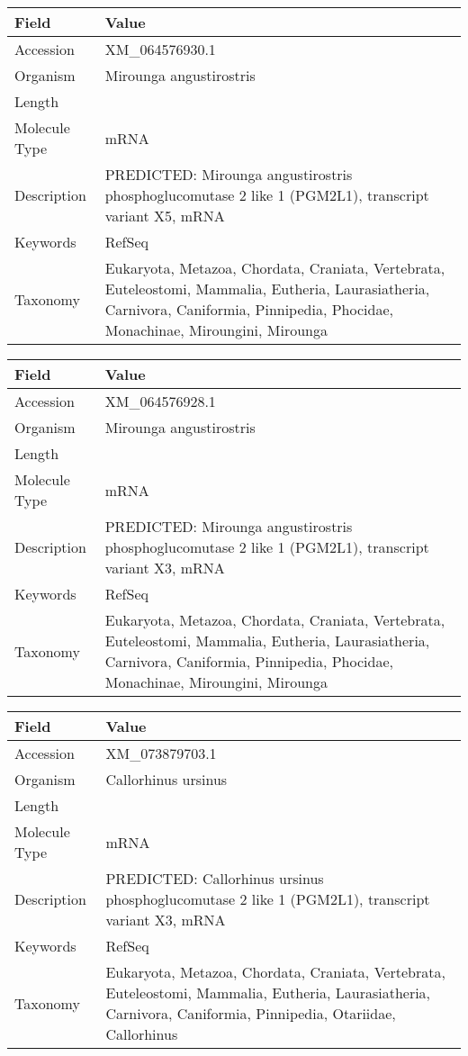 \documentclass[10pt]{article}
\begin{document}
\vspace{1em}
{\footnotesize
\begin{longtable}{>{\raggedright\arraybackslash}p{4.5cm} >{\raggedright\arraybackslash}p{11.5cm}}
\textbf{Field} & \textbf{Value} \\
\hline
Accession & XM\_064576930.1 \\
Organism & Mirounga angustirostris \\
Length & 7932 \\
Molecule Type & mRNA \\
Description & PREDICTED: Mirounga angustirostris phosphoglucomutase 2 like 1 (PGM2L1), transcript variant X5, mRNA \\
Keywords & RefSeq \\
Taxonomy & Eukaryota, Metazoa, Chordata, Craniata, Vertebrata, Euteleostomi, Mammalia, Eutheria, Laurasiatheria, Carnivora, Caniformia, Pinnipedia, Phocidae, Monachinae, Miroungini, Mirounga \\
\end{longtable}
}

\vspace{1em}
{\footnotesize
\begin{longtable}{>{\raggedright\arraybackslash}p{4.5cm} >{\raggedright\arraybackslash}p{11.5cm}}
\textbf{Field} & \textbf{Value} \\
\hline
Accession & XM\_064576928.1 \\
Organism & Mirounga angustirostris \\
Length & 8015 \\
Molecule Type & mRNA \\
Description & PREDICTED: Mirounga angustirostris phosphoglucomutase 2 like 1 (PGM2L1), transcript variant X3, mRNA \\
Keywords & RefSeq \\
Taxonomy & Eukaryota, Metazoa, Chordata, Craniata, Vertebrata, Euteleostomi, Mammalia, Eutheria, Laurasiatheria, Carnivora, Caniformia, Pinnipedia, Phocidae, Monachinae, Miroungini, Mirounga \\
\end{longtable}
}

\vspace{1em}
{\footnotesize
\begin{longtable}{>{\raggedright\arraybackslash}p{4.5cm} >{\raggedright\arraybackslash}p{11.5cm}}
\textbf{Field} & \textbf{Value} \\
\hline
Accession & XM\_073879703.1 \\
Organism & Callorhinus ursinus \\
Length & 2846 \\
Molecule Type & mRNA \\
Description & PREDICTED: Callorhinus ursinus phosphoglucomutase 2 like 1 (PGM2L1), transcript variant X3, mRNA \\
Keywords & RefSeq \\
Taxonomy & Eukaryota, Metazoa, Chordata, Craniata, Vertebrata, Euteleostomi, Mammalia, Eutheria, Laurasiatheria, Carnivora, Caniformia, Pinnipedia, Otariidae, Callorhinus \\
\end{longtable}
}
\end{document}
